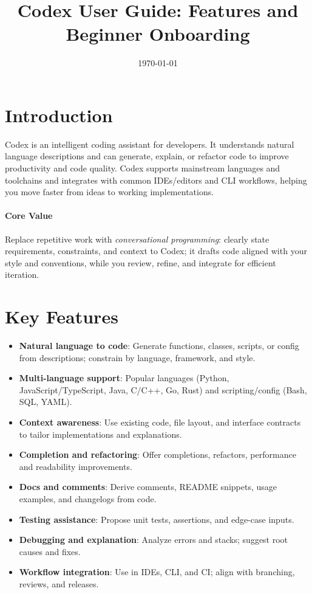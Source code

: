 \documentclass{article}
\title{Codex User Guide: Features and Beginner Onboarding}
\author{}
\date{\today}
\begin{document}
\maketitle
\tableofcontents
\vspace{0.5em}

\section{Introduction}
Codex is an intelligent coding assistant for developers. It understands natural language descriptions and can generate, explain, or refactor code to improve productivity and code quality. Codex supports mainstream languages and toolchains and integrates with common IDEs/editors and CLI workflows, helping you move faster from ideas to working implementations.

\paragraph{Core Value}
Replace repetitive work with \emph{conversational programming}: clearly state requirements, constraints, and context to Codex; it drafts code aligned with your style and conventions, while you review, refine, and integrate for efficient iteration.

\section{Key Features}
\begin{itemize}
  \item \textbf{Natural language to code}: Generate functions, classes, scripts, or config from descriptions; constrain by language, framework, and style.
  \item \textbf{Multi-language support}: Popular languages (Python, JavaScript/TypeScript, Java, C/C++, Go, Rust) and scripting/config (Bash, SQL, YAML).
  \item \textbf{Context awareness}: Use existing code, file layout, and interface contracts to tailor implementations and explanations.
  \item \textbf{Completion and refactoring}: Offer completions, refactors, performance and readability improvements.
  \item \textbf{Docs and comments}: Derive comments, README snippets, usage examples, and changelogs from code.
  \item \textbf{Testing assistance}: Propose unit tests, assertions, and edge-case inputs.
  \item \textbf{Debugging and explanation}: Analyze errors and stacks; suggest root causes and fixes.
  \item \textbf{Workflow integration}: Use in IDEs, CLI, and CI; align with branching, reviews, and releases.
\end{itemize}
\end{document}
